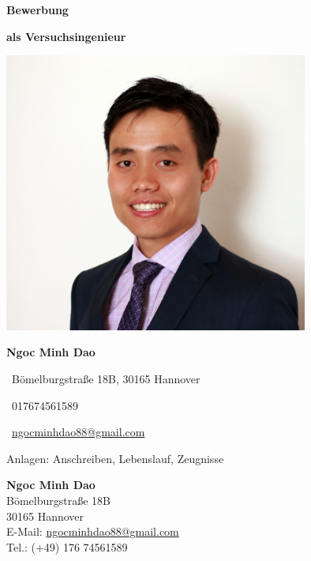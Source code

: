 \documentclass[11pt,a4paper]{article}
\newcommand{\JobName}{Versuchsingenieur}
\begin{document}
\pagestyle{empty}

\begin{center}
    \textbf{\fontsize{40}{48} \selectfont Bewerbung}
    \vspace{1em}

    \textbf{\fontsize{24}{28} \selectfont als \JobName}

    \includegraphics[width=10cm]{./bilde/bewerbungsfoto_small.jpg}
    \vspace{1em}

    \textbf{\fontsize{32}{38} \selectfont Ngoc Minh Dao}

    \fontsize{20}{24} \selectfont \faHome~Bömelburgstraße 18B, 30165 Hannover
    \vspace{1em}

    \faPhone~017674561589

    \faEnvelope~\href{mailto:ngocminhdao88@gmail.com}{ngocminhdao88@gmail.com}

    \vfill
    Anlagen: Anschreiben, Lebenslauf, Zeugnisse

\end{center}

\newpage

\begin{flushleft}
    \textbf{Ngoc Minh Dao}\\
    Bömelburgstraße 18B\\
    30165 Hannover\\
    E-Mail: \href{mailto:ngocminhdao88@gmail.com}{ngocminhdao88@gmail.com}\\
    Tel.: (+49) 176 74561589
\end{flushleft}
\end{document}
